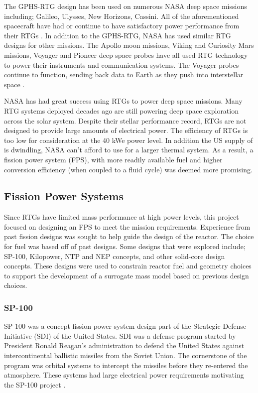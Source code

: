 The GPHS-RTG design has been used on
numerous NASA deep space missions including; Galileo, Ulysses, New Horizons,
Cassini. All of the aforementioned spacecraft have had or continue to have
satisfactory power performance from their RTGs \citep{bennett_mission_2006}.
In addition to the GPHS-RTG, NASA has used similar RTG designs for other
missions. The Apollo moon missions, Viking and Curiosity Mars missions, Voyager
and Pioneer deep space probes have all used RTG technology to power their
instruments and communication systems. The Voyager probes continue to function,
sending back data to Earth as they push into interstellar space
\citep{mmrtg_fact}.

NASA has had great success using RTGs to power deep space missions. Many
RTG systems deployed decades ago are still powering deep space exploration
across the solar system. Despite their stellar performance record, RTGs are not
designed to provide large amounts of electrical power. The efficiency of RTGs is
too low for consideration at the 40 kWe power level. In addition the US supply of \pu
is dwindling, NASA can't afford to use \pu for a larger thermal system. As a
result, a fission power system (FPS), with more readily available fuel and higher conversion
efficiency (when coupled to a fluid cycle) was deemed more promising.

\subsection{Fission Power Systems}
Since RTGs have limited mass performance at high power levels, this project
focused on designing an
FPS to meet the mission requirements. Experience from past
fission designs was sought to help guide the design of the reactor. The choice
for fuel was based off of past designs. Some designs that were explored include;
SP-100, Kilopower, NTP and NEP concepts, and other solid-core design concepts.
These designs were used to constrain reactor fuel and geometry choices to
support the development of a surrogate mass model based on previous design
choices.
    
\subsubsection{SP-100}
    SP-100 was a concept fission power system design part of the
    Strategic Defense Initiative (SDI) of the United States. SDI was a defense program started by
    President Ronald Reagan's administration to defend the United States against intercontinental
    ballistic missiles from the Soviet Union. The cornerstone of the program was orbital systems to
    intercept the missiles before they re-entered the atmosphere. These systems
    had large electrical power requirements motivating the SP-100 project
    \citep{sp100}.

